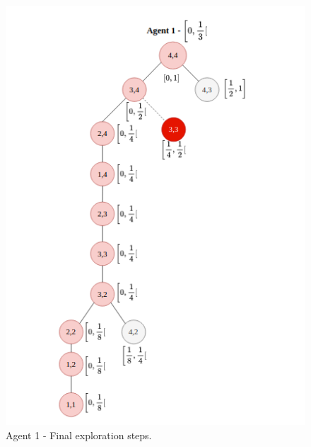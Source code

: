 \begin{figure}[H]
    \centering
    \includegraphics[width=1\textwidth]{ApeA/maze_agent_1_step_4.png}
    \caption{Agent 1 - Final exploration steps.}
    \label{fig_agent_1_step_4}
\end{figure}

